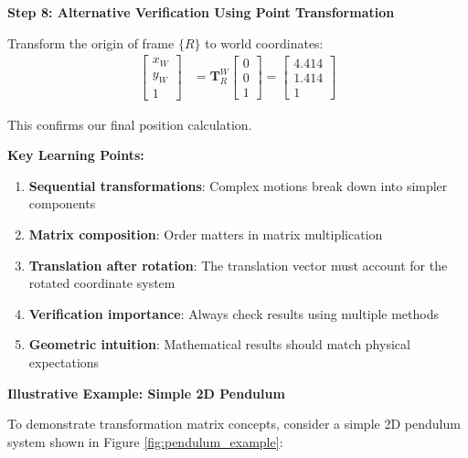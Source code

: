 \documentclass[11pt,a4paper]{article}
\begin{document}
\textbf{Step 8: Alternative Verification Using Point Transformation}

Transform the origin of frame $\{R\}$ to world coordinates:
\begin{align}
\begin{bmatrix} x_W \\ y_W \\ 1 \end{bmatrix} &= \bm{T}_R^W \begin{bmatrix} 0 \\ 0 \\ 1 \end{bmatrix} = \begin{bmatrix} 4.414 \\ 1.414 \\ 1 \end{bmatrix}
\end{align}

This confirms our final position calculation.

\textbf{Key Learning Points:}
\begin{enumerate}
    \item \textbf{Sequential transformations}: Complex motions break down into simpler components
    \item \textbf{Matrix composition}: Order matters in matrix multiplication
    \item \textbf{Translation after rotation}: The translation vector must account for the rotated coordinate system
    \item \textbf{Verification importance}: Always check results using multiple methods
    \item \textbf{Geometric intuition}: Mathematical results should match physical expectations
\end{enumerate}

\textbf{Illustrative Example: Simple 2D Pendulum}

To demonstrate transformation matrix concepts, consider a simple 2D pendulum system shown in Figure \ref{fig:pendulum_example}:
\end{document}
